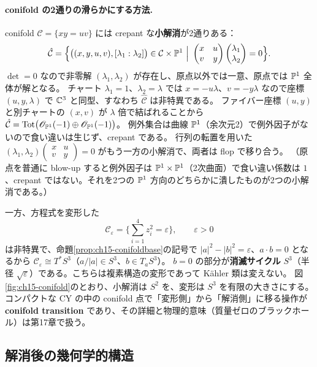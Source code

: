 \paragraph{conifold の2通りの滑らかにする方法.}
conifold $\mathcal C = \{xy = uv\}$ には crepant な\textbf{小解消}が2通りある：
\[
\hat{\mathcal C} = \Big\{\big((x,y,u,v),[\lambda_1:\lambda_2]\big)\in\mathcal C\times\PP^1\ \Big|\ \begin{pmatrix}x&u\\v&y\end{pmatrix}\begin{pmatrix}\lambda_1\\\lambda_2\end{pmatrix} = 0\Big\}.
\]
$\det = 0$ なので非零解 $(\lambda_1,\lambda_2)$ が存在し、原点以外では一意、原点では $\mathbb{P}^1$ 全体が解となる。
チャート $\lambda_1 = 1$、$\lambda_2 = \lambda$ では $x = -u\lambda$、$v = -y\lambda$ なので座標 $(u,y,\lambda)$ で $\mathbb{C}^3$ と同型、すなわち $\hat{\mathcal C}$ は非特異である。
ファイバー座標 $(u,y)$ と別チャートの $(x,v)$ が $\lambda$ 倍で結ばれることから $\hat{\mathcal C} = \text{Tot}\big(\mathscr{O}_{\mathbb{P}^1}(-1)\oplus\mathscr{O}_{\mathbb{P}^1}(-1)\big)$。
例外集合は曲線 $\mathbb{P}^1$（余次元2）で例外因子がないので食い違いは生じず、crepant である。
行列の転置を用いた $(\lambda_1,\lambda_2)\begin{pmatrix}x&u\\v&y\end{pmatrix} = 0$ がもう一方の小解消で、両者は flop で移り合う。
（原点を普通に blow-up すると例外因子は $\mathbb{P}^1\times\mathbb{P}^1$（2次曲面）で食い違い係数は $1$、crepant ではない。それを2つの $\mathbb{P}^1$ 方向のどちらかに潰したものが2つの小解消である。）

一方、方程式を変形した
\[
\mathcal C_\varepsilon = \Big\{\sum_{i=1}^4z_i^2 = \varepsilon\Big\},\qquad \varepsilon>0
\]
は非特異で、命題\ref{prop:ch15-conifoldbase}の記号で $|a|^2-|b|^2 = \varepsilon$、$a\cdot b = 0$ となるから $\mathcal C_\varepsilon\cong T^*S^3$（$a/|a|\in S^3$、$b\in T_{a}S^3$）。
$b = 0$ の部分が\textbf{消滅サイクル} $S^3$（半径 $\sqrt\varepsilon$）である。こちらは複素構造の変形であって K\"ahler 類は変えない。
図\ref{fig:ch15-conifold}のとおり、小解消は $S^2$ を、変形は $S^3$ を有限の大きさにする。
コンパクトな CY の中の conifold 点で「変形側」から「解消側」に移る操作が \textbf{conifold transition} であり、その詳細と物理的意味（質量ゼロのブラックホール）は第17章で扱う。

\subsection{解消後の幾何学的構造}

